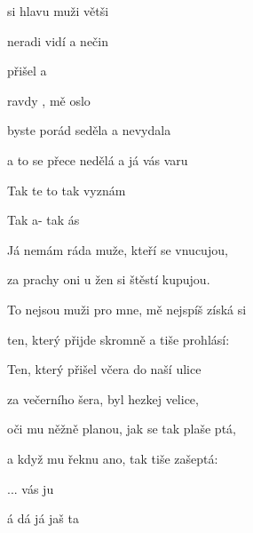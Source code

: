 
 
 
 
 

\zs
{} si hlavu 
 muži větši

neradi vidí 
 a nečin

 přišel 
 a  

ravdy ,
 mě oslo
\ks

\zr
{} byste porád seděla
a nevydala 

a to se přece nedělá
a já vás varu

Tak te to 
tak  vyznám 

Tak a-  
tak ás 

     
\kr

\zs
Já nemám ráda muže,
kteří se vnucujou,

za prachy oni u žen
si štěstí kupujou.

To nejsou muži pro mne,
mě nejspíš získá si

ten, který přijde skromně
a tiše prohlásí:
\ks

\zr \kr

\zs
Ten, který přišel včera
do naší ulice

za večerního šera,
byl hezkej velice,

oči mu něžně planou,
jak se tak plaše ptá,

a když mu řeknu ano,
tak tiše zašeptá:
\ks

\zr

... vás ju

á dá  já jaš ta 
\kr
\kp


